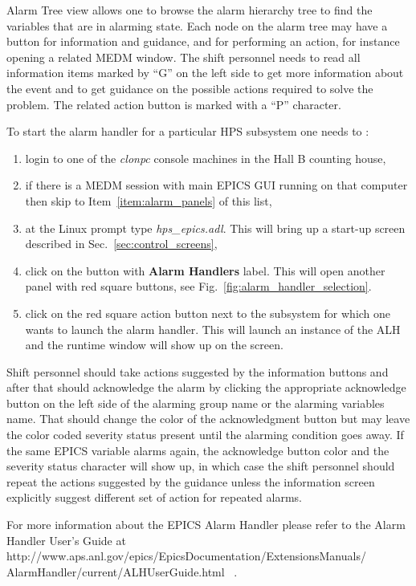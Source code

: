 \documentclass[letter,10pt]{article}
\begin{document}
Alarm Tree view allows one to browse the alarm hierarchy tree to find the variables 
that are in alarming state. Each node on the alarm tree may have a button for information and guidance, and for performing an action, for instance 
opening a related MEDM window. 
The shift personnel needs to read all information items marked by ``G'' on the left side to get more information about the event and to get 
guidance on the possible actions required to solve the problem. The related action button is marked with a ``P'' character. 

To start the alarm handler for a particular HPS subsystem one needs to :
\begin{enumerate}
 \item login to one of the \textit{clonpc} console machines in the Hall B counting house,
 \item if there is a MEDM session with main EPICS GUI running on that computer then skip to Item~\ref{item:alarm_panels} of this list,
 \item at the Linux prompt type \textit{hps\_epics.adl}. This will bring up a start-up screen described in Sec.~\ref{sec:control_screens}, 
 \item \label{item:alarm_panels} click on the  button with \textbf{Alarm Handlers} label. This will open another panel 
       with red square buttons, see Fig.~\ref{fig:alarm_handler_selection}.
 \item click on the red square action button next to the subsystem for which one wants to launch the alarm handler. This will 
       launch an instance of the ALH and the runtime window will show up on the screen.
\end{enumerate}

Shift personnel should take actions suggested by the information buttons and after that should acknowledge the alarm by clicking the 
appropriate acknowledge button on the left side of the alarming group name or the alarming variables name. That should change  
the color of the acknowledgment button but may leave the color coded severity status present until the alarming condition goes away. 
If the same EPICS variable alarms again, the acknowledge button color and the severity status character will show up, in which case 
the shift personnel should repeat the actions suggested by the guidance unless the information screen explicitly suggest different set of 
action for repeated alarms.

For more information about the EPICS Alarm Handler please refer to the Alarm Handler User's Guide  at \newline 
http://www.aps.anl.gov/epics/EpicsDocumentation/ExtensionsManuals/ \newline AlarmHandler/current/ALHUserGuide.html ~.
\end{document}
